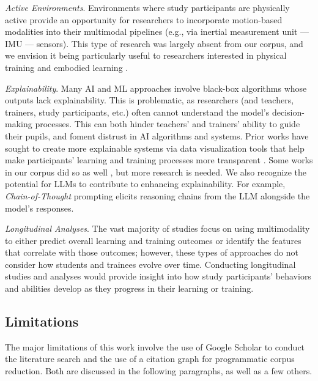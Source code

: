 \documentclass[manuscript,screen,review]{acmart}
\begin{document}
\textit{Active Environments}. Environments where study participants are physically active provide an opportunity for researchers to incorporate motion-based modalities into their multimodal pipelines (e.g., via inertial measurement unit --- IMU --- sensors). This type of research was largely absent from our corpus, and we envision it being particularly useful to researchers interested in physical training and embodied learning \cite{zhou2023embodiedai}.

\textit{Explainability}. Many AI and ML approaches involve black-box algorithms whose outputs lack explainability. This is problematic, as researchers (and teachers, trainers, study participants, etc.) often cannot understand the model's decision-making processes. This can both hinder teachers' and trainers' ability to guide their pupils, and foment distrust in AI algorithms and systems. Prior works have sought to create more explainable systems via data visualization tools that help make participants' learning and training processes more transparent \cite{hutchins2022co,vatral2023comparative,davalos2023chimerapy}. Some works in our corpus did so as well \cite{2609260641,2879332689}, but more research is needed. We also recognize the potential for LLMs to contribute to enhancing explainability. For example, \textit{Chain-of-Thought} prompting \cite{wei2022chain} elicits reasoning chains from the LLM alongside the model's responses.

\textit{Longitudinal Analyses}. The vast majority of studies focus on using multimodality to either predict overall learning and training outcomes or identify the features that correlate with those outcomes; however, these types of approaches do not consider how students and trainees evolve over time. Conducting longitudinal studies and analyses would provide insight into how study participants' behaviors and abilities develop as they progress in their learning or training. 

\subsection{Limitations}
The major limitations of this work involve the use of Google Scholar to conduct the literature search and the use of a citation graph for programmatic corpus reduction. Both are discussed in the following paragraphs, as well as a few others.
\end{document}
